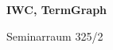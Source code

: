 \documentclass[a4paper]{article}
\begin{document}
\printGenericVSLHeader
\begin{center}
\begin{vsltext}{3cm}{4cm}

   \vspace{0.5cm} 

    \textbf{IWC, TermGraph} 

    \vspace{1.5cm}

    Seminarraum 325/2

\end{vsltext}

\end{center}
\end{document}
